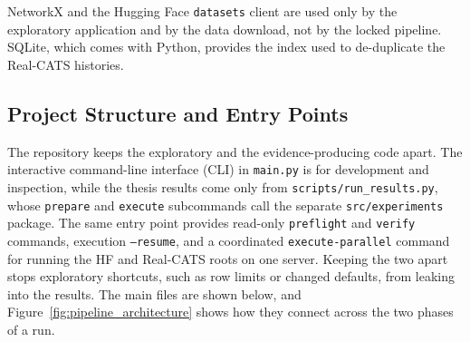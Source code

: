 \documentclass{thesisclass}
\begin{document}
NetworkX and the Hugging Face \texttt{datasets} client are used only by the
exploratory application and by the data download, not by the locked pipeline.
SQLite, which comes with Python, provides the index used to de-duplicate the
Real-CATS histories.

\subsection{Project Structure and Entry Points}

The repository keeps the exploratory and the evidence-producing code apart. The
interactive command-line interface (CLI) in \texttt{main.py} is for development
and inspection, while the thesis
results come only from \texttt{scripts/run\_results.py}, whose \texttt{prepare} and
\texttt{execute} subcommands call the separate \texttt{src/experiments} package.
The same entry point provides read-only \texttt{preflight} and \texttt{verify}
commands, execution \texttt{--resume}, and a coordinated
\texttt{execute-parallel} command for running the HF and Real-CATS roots on one
server.
Keeping the two apart stops exploratory shortcuts, such as row limits or changed
defaults, from leaking into the results. The main files are shown below, and
Figure~\ref{fig:pipeline_architecture} shows how they connect across the two
phases of a run.
\end{document}
